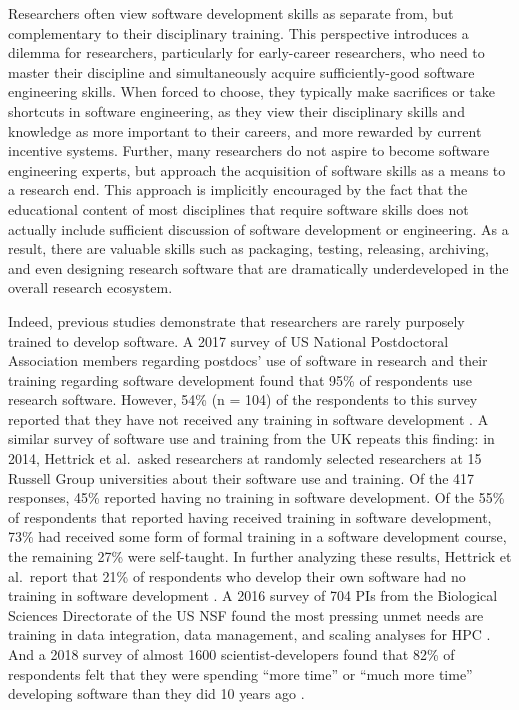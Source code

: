 \documentclass[
]{book}
\begin{document}
Researchers often view software development skills as separate from, but complementary to
their disciplinary training. This perspective introduces a dilemma for researchers, particularly
for early-career researchers, who need to master their discipline and simultaneously acquire
sufficiently-good software engineering skills. When forced to choose, they typically make sacrifices
or take shortcuts in software engineering, as they view their disciplinary skills and knowledge as
more important to their careers, and more rewarded by current incentive systems. Further, many
researchers do not aspire to become software engineering experts, but approach the acquisition of
software skills as a means to a research end. This approach is implicitly encouraged by the fact
that the educational content of most disciplines that require software skills does not actually
include sufficient discussion of software development or engineering. As a result, there are valuable
skills such as packaging, testing, releasing, archiving, and even designing research software that
are dramatically underdeveloped in the overall research ecosystem.

Indeed, previous studies demonstrate that researchers are rarely purposely trained to develop software.
A 2017 survey of US National Postdoctoral Association members regarding postdocs' use of software in
research and their training regarding software development found that 95\% of respondents use research
software. However, 54\% (n = 104) of the respondents to this survey reported that they have not
received any training in software development \citep{nangia_katz_2017}. A similar survey of software
use and training from the UK repeats this finding: in 2014, Hettrick et al.~asked researchers at
randomly selected researchers at 15 Russell Group universities about their software use and training.
Of the 417 responses, 45\% reported having no training in software development. Of the 55\% of respondents
that reported having received training in software development, 73\% had received some form of
formal training in a software development course, the remaining 27\% were self-taught. In further analyzing
these results, Hettrick et al.~report that 21\% of respondents who develop their own software had
no training in software development \citep{simon_hettrick_2018_1183562, Hettrick-blog}. A 2016 survey
of 704 PIs from the Biological Sciences Directorate of the US NSF found the most pressing unmet
needs are training in data integration, data management, and scaling analyses for HPC \citep{barone2017unmet}.
And a 2018 survey of almost 1600 scientist-developers found that 82\% of respondents felt that
they were spending ``more time'' or ``much more time'' developing software than they did 10 years ago \citep{Pinto2018}.
\end{document}
